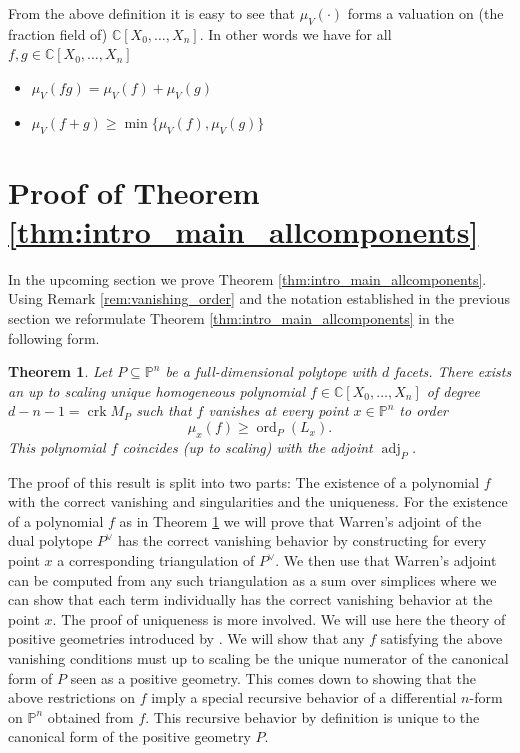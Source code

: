 \documentclass[a4paper,10pt]{amsart}
\theoremstyle{definition}
\theoremstyle{plain}
\newtheorem{thm}[defin]{Theorem}
\newcommand{\ord}{\operatorname{ord}}
\newcommand{\adj}{\operatorname{adj}} %
\newcommand{\crk}{\operatorname{crk}}
\newcommand{\C}{{\mathbb C}}
\newcommand{\pp}{\mathbb{P}}
\begin{document}
From the above definition it is easy to see that $\mu_V(\cdot)$ forms a valuation on (the fraction field of) $\C[X_0,\ldots,X_n]$. In other words we have for all $f,g \in \C[X_0,\ldots,X_n]$ \begin{itemize}
    \item $\mu_V(fg)=\mu_V(f)+\mu_V(g)$
    \item $\mu_V(f+g)\geq \min\{\mu_V(f),\mu_V(g)\}$
\end{itemize}


\section{Proof of Theorem \ref{thm:intro_main_allcomponents}} \label{sec: main_thm_Julian}
In the upcoming section we prove Theorem \ref{thm:intro_main_allcomponents}. Using Remark \ref{rem:vanishing_order} and the notation established in the previous section we reformulate Theorem \ref{thm:intro_main_allcomponents} in the following form.
\begin{thm} \label{mainTh}
 Let $P\subseteq \pp^n$ be a full-dimensional polytope with $d$ facets. There exists an up to scaling unique homogeneous polynomial $f\in \C[X_0,\ldots,X_n]$ of degree $d-n-1=\crk{M_P}$ such that $f$ vanishes at every point $x \in \pp^n$ to order
 \begin{equation*}
    \mu_x(f)\geq \ord_P(L_x).
 \end{equation*}
 This polynomial $f$ coincides (up to scaling) with the adjoint $\adj_P$.
\end{thm}

The proof of this result is split into two parts: The existence of a polynomial $f$ with the correct vanishing and singularities and the uniqueness.
For the existence of a polynomial $f$ as in Theorem \ref{mainTh} we will prove that Warren's adjoint of the dual polytope $P^\vee$ has the correct vanishing behavior by constructing for every point $x$ a corresponding triangulation of $P^\vee$. We then use that Warren's adjoint can be computed from any such triangulation as a sum over simplices where we can show that each term individually has the correct vanishing behavior at the point $x$. The proof of uniqueness is more involved. We will use here the theory of positive geometries introduced by \cite{ArkanihamedBaiLam2017PosGeom}. We will show that any $f$ satisfying the above vanishing conditions must up to scaling be the unique numerator of the canonical form of $P$ seen as a positive geometry. This comes down to showing that the above restrictions on $f$ imply a special recursive behavior of a differential $n$-form on $\pp^n$ obtained from $f$. This recursive behavior by definition is unique to the canonical form of the positive geometry $P$.
\end{document}
